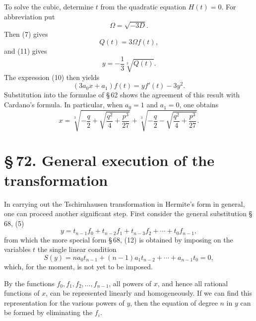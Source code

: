 \documentclass[11pt]{article}
\providecommand{\sect}[2]{\section*{\S\,#1. #2}}
\begin{document}
To solve the cubic, determine $t$ from the quadratic equation $H(t)=0$. For abbreviation put
\begin{equation}
 \Omega=\sqrt{-3D}.
\tag{12}
\end{equation}
Then (7) gives
\begin{equation}
 Q(t)=3\Omega f(t),
\tag{13}
\end{equation}
and (11) gives
\begin{equation}
 y=-\frac13\sqrt[3]{Q(t)}.
\tag{14}
\end{equation}
The expression (10) then yields
\begin{equation}
 (3a_0x+a_1)f(t)=yf'(t)-3y^2.
\tag{15}
\end{equation}
Substitution into the formulae of \S\,62 shows the agreement of this result with Cardano's formula. In particular, when $a_0=1$ and $a_1=0$, one obtains
\begin{equation}
 x=\sqrt[3]{-\frac q2+\sqrt{\frac{q^2}{4}+\frac{p^3}{27}}}
  +\sqrt[3]{-\frac q2-\sqrt{\frac{q^2}{4}+\frac{p^3}{27}}}.
\tag{17}
\end{equation}

\sect{72}{General execution of the transformation}

In carrying out the Tschirnhausen transformation in Hermite's form in general, one can proceed another significant step. First consider the general substitution \S\,68, (5)
\begin{equation}
 y=t_{n-1}f_0+t_{n-2}f_1+t_{n-3}f_2+\cdots+t_0f_{n-1},
\tag{1}
\end{equation}
from which the more special form \S\,68, (12) is obtained by imposing on the variables $t$ the single linear condition
\begin{equation}
 S(y)=na_0t_{n-1}+(n-1)a_1t_{n-2}+\cdots+a_{n-1}t_0=0,
\tag{2}
\end{equation}
which, for the moment, is not yet to be imposed.

By the functions $f_0,f_1,f_2,\ldots,f_{n-1}$, all powers of $x$, and hence all rational functions of $x$, can be represented linearly and homogeneously. If we can find this representation for the various powers of $y$, then the equation of degree $n$ in $y$ can be formed by eliminating the $f_i$.
\end{document}
